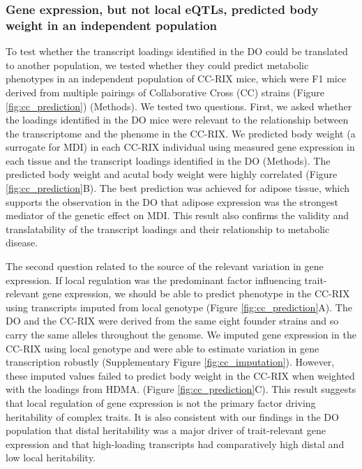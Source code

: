 \documentclass[
]{article}
\begin{document}
\subsubsection{Gene expression, but not local eQTLs, predicted body
weight in an independent
population}\label{gene-expression-but-not-local-eqtls-predicted-body-weight-in-an-independent-population}

To test whether the transcript loadings identified in the DO could be
translated to another population, we tested whether they could predict
metabolic phenotypes in an independent population of CC-RIX mice, which
were F1 mice derived from multiple pairings of Collaborative Cross (CC)
\cite{pmid28592495, pmid21411855, 
pmid17674098, pmid15514660} strains (Figure \ref{fig:cc_prediction})
(Methods). We tested two questions. First, we asked whether the loadings
identified in the DO mice were relevant to the relationship between the
transcriptome and the phenome in the CC-RIX. We predicted body weight (a
surrogate for MDI) in each CC-RIX individual using measured gene
expression in each tissue and the transcript loadings identified in the
DO (Methods). The predicted body weight and acutal body weight were
highly correlated (Figure \ref{fig:cc_prediction}B). The best prediction
was achieved for adipose tissue, which supports the observation in the
DO that adipose expression was the strongest mediator of the genetic
effect on MDI. This result also confirms the validity and
translatability of the transcript loadings and their relationship to
metabolic disease.

The second question related to the source of the relevant variation in
gene expression. If local regulation was the predominant factor
influencing trait-relevant gene expression, we should be able to predict
phenotype in the CC-RIX using transcripts imputed from local genotype
(Figure \ref{fig:cc_prediction}A). The DO and the CC-RIX were derived
from the same eight founder strains and so carry the same alleles
throughout the genome. We imputed gene expression in the CC-RIX using
local genotype and were able to estimate variation in gene transcription
robustly (Supplementary Figure \ref{fig:cc_imputation}). However, these
imputed values failed to predict body weight in the CC-RIX when weighted
with the loadings from HDMA. (Figure \ref{fig:cc_prediction}C). This
result suggests that local regulation of gene expression is not the
primary factor driving heritability of complex traits. It is also
consistent with our findings in the DO population that distal
heritability was a major driver of trait-relevant gene expression and
that high-loading transcripts had comparatively high distal and low
local heritability.
\end{document}
